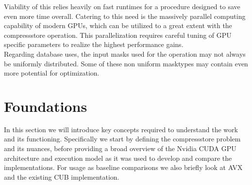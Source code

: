 \documentclass{tudscrreprt}
\begin{document}
			Viability of this relies heavily on fast runtimes for a procedure designed to save even more time overall. Catering to this need is the massively parallel computing capability of modern GPUs, which can be utilized to a great extent with the compressstore operation. This parallelization requires careful tuning of GPU specific parameters to realize the highest performance gains. \\
			
			Regarding database uses, the input masks used for the operation may not always be uniformly distributed. Some of these non uniform masktypes may contain even more potential for optimization. \\
		
	\chapter{Foundations}
		In this section we will introduce key concepts required to understand the work and its functioning. Specifically we start by defining the compressstore problem and its nuances, before providing a broad overview of the Nvidia CUDA GPU architecture and execution model as it was used to develop and compare the implementations. For usage as baseline comparisons we also briefly look at AVX and the existing CUB implementation.
	
\end{document}
